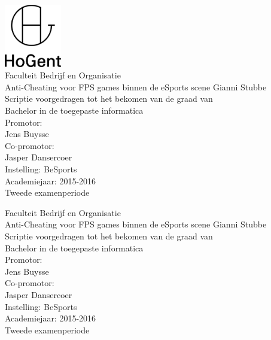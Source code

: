 \documentclass[pdftex,a4paper,12pt,twoside]{report}
\newcommand{\emptypage}{
\newpage
\thispagestyle{empty}
\mbox{}
\newpage
}
\newcommand{\student}{Gianni Stubbe}
\newcommand{\promotor}{Jens Buysse}
\newcommand{\copromotor}{Jasper Dansercoer}
\newcommand{\instelling}{BeSports}
\newcommand{\titel}{Anti-Cheating voor FPS games binnen de eSports scene}
\newcommand{\faculteit}{Faculteit Bedrijf en Organisatie}
\newcommand{\rapporttype}{Scriptie voorgedragen tot het bekomen van de graad van\\Bachelor in de toegepaste informatica}
\newcommand{\academiejaar}{2015-2016}
\newcommand{\examenperiode}{Tweede examenperiode}
\begin{document}

\begin{titlepage}
  \begin{center}

    \begingroup
    \rmfamily
    \includegraphics[width=2.5cm]{img/HG-beeldmerk-woordmerk}\\[.5cm]
    \faculteit\\[3cm]
    \titel
    \vfill
    \student\\[3.5cm]
    \rapporttype\\[2cm]
    Promotor:\\
    \promotor\\
    Co-promotor:\\
    \copromotor\\[2.5cm]
    Instelling: \instelling\\[.5cm]
    Academiejaar: \academiejaar\\[.5cm]
    \examenperiode
    \endgroup

  \end{center}
  \restoregeometry
\end{titlepage}


\emptypage


\begin{titlepage}
  \begin{center}

    \begingroup
    \rmfamily
    \faculteit\\[3cm]
    \titel
    \vfill
    \student\\[3.5cm]
    \rapporttype\\[2cm]
    Promotor:\\
    \promotor\\
    Co-promotor:\\
    \copromotor\\[2.5cm]
    Instelling: \instelling\\[.5cm]
    Academiejaar: \academiejaar\\[.5cm]
    \examenperiode
    \endgroup

  \end{center}
  \restoregeometry
\end{titlepage}
\end{document}
